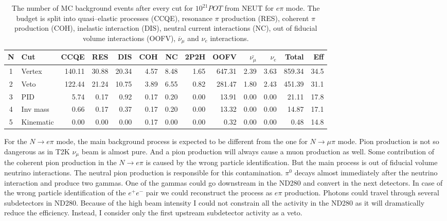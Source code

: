 \documentclass[../main.tex]{subfiles}
\begin{document}
\begin{table}[!ht]
\begin{tabular}{|c|l|r|r|r|r|r|r|r|r|r|r|r|}
  \hline
  N & Cut           &  CCQE   &  RES  &  DIS  &  COH  &  NC  &  2P2H  &  OOFV  &$\bar{\nu_{\mu}}$& $\nu_{e}$ & Total  & Eff\\
  \hline
  1 & Vertex        & 140.11  & 30.88 & 20.34 & 4.57  & 8.48 & 1.65   & 647.31 & 2.39            &  3.63     & 859.34 & 34.5 \\
  \hline
  2 & Veto      & 122.44  & 21.24 & 10.75 & 3.89  & 6.55 & 0.82   & 281.47 & 1.80            &  2.43     & 451.39 & 31.1 \\
  \hline
  3 & PID          & 5.74    & 0.17  & 0.92  & 0.17  & 0.20 & 0.00   & 13.91  & 0.00            &  0.00     &  21.11 & 17.8 \\
  \hline
  4 & Inv mass      & 0.66    & 0.17  & 0.37  & 0.17  & 0.20 & 0.00   & 13.32  & 0.00            &  0.00     &  14.87 & 17.1  \\
  \hline
  5 & Kinematic     & 0.00    & 0.00  & 0.00  & 0.17  & 0.00 & 0.00   & 0.32   & 0.00            &  0.00     &  0.48  & 14.8 \\
    \hline

\end{tabular}
\caption{The number of MC background events after every cut for $10^{21} POT$ from NEUT for $e\pi$ mode. The budget is split into quasi--elastic processes (CCQE), resonance $\pi$ production (RES), coherent $\pi$ production (COH), inelastic interaction (DIS), neutral current interactions (NC), out of fiducial volume interactions (OOFV), $\overline{\nu}_\mu$ and $\nu_e$ interactions.}
\label{tbl:HNL:bgOrigEle}
\end{table}

For the $N\to e\pi$ mode, the main background process is expected to be different from the one for $N\to\mu\pi$ mode. Pion production is not so dangerous as in T2K $\nu_\mu$  beam is almost pure. And a pion production will always cause a muon production as well. Some contribution of the coherent pion production in the $N\to e\pi$ is caused by the wrong particle identification. But the main process is out of fiducial volume neutrino interactions. The neutral pion production is responsible for this contamination. $\pi^0$ decays almost immediately after the neutrino interaction and produce two gammas. One of the gammas could go downstream in the ND280 and convert in the next detectors. In case of the wrong particle identification of the $e^+e^-$ pair we could reconstruct the process as $e\pi$ production. Photons could travel through several subdetectors in ND280. Because of the high beam intensity I could not constrain all the activity in the ND280 as it will dramatically reduce the efficiency. Instead, I consider only the first upstream subdetector activity as a veto.
\end{document}
